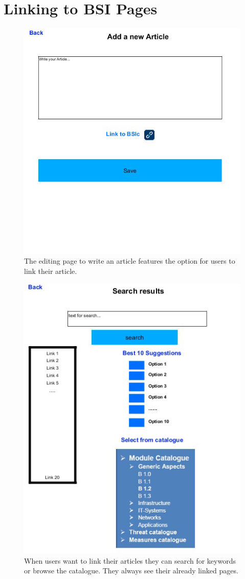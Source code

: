 \section{Linking to BSI Pages}
\label{appendix_bsi_link}

\begin{figure}[h]  
    \centering
    \includegraphics[page=1,width=.8\textwidth]{Pictures/link_to_bsi_1.jpg}
    \caption{The editing page to write an article features the option for users to link their article.}
\end{figure}

\begin{figure}[h]  
    \centering
    \includegraphics[page=1,width=.8\textwidth]{Pictures/link_to_bsi_2.jpg}
    \caption{When users want to link their articles they can search for keywords or browse the catalogue. 
            They always see their already linked pages.}
\end{figure}


